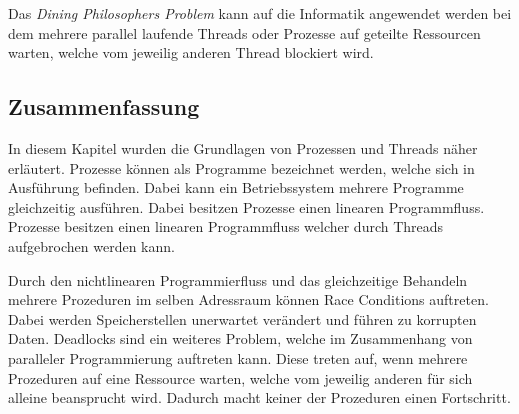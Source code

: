 Das \emph{Dining Philosophers Problem} kann auf die Informatik angewendet werden bei dem mehrere parallel laufende Threads oder Prozesse auf geteilte Ressourcen warten, welche vom jeweilig anderen Thread blockiert wird.

\subsection{Zusammenfassung}
In diesem Kapitel wurden die Grundlagen von Prozessen und Threads näher erläutert. Prozesse können als Programme bezeichnet werden, welche sich in Ausführung befinden. Dabei kann ein Betriebssystem mehrere Programme gleichzeitig ausführen. Dabei besitzen Prozesse einen linearen Programmfluss. Prozesse besitzen einen linearen Programmfluss welcher durch Threads aufgebrochen werden kann.

Durch den nichtlinearen Programmierfluss und das gleichzeitige Behandeln mehrere Prozeduren im selben Adressraum können Race Conditions auftreten. Dabei werden Speicherstellen unerwartet verändert und führen zu korrupten Daten. Deadlocks sind ein weiteres Problem, welche im Zusammenhang von paralleler Programmierung auftreten kann. Diese treten auf, wenn mehrere Prozeduren auf eine Ressource warten, welche vom jeweilig anderen für sich alleine beansprucht wird. Dadurch macht keiner der Prozeduren einen Fortschritt. 